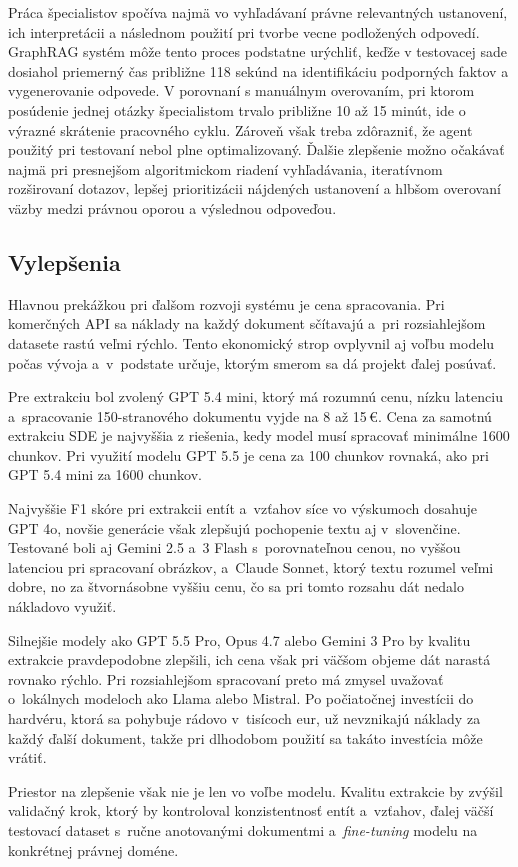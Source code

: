 Práca špecialistov spočíva najmä vo vyhľadávaní právne relevantných ustanovení, ich interpretácii a následnom použití pri tvorbe vecne podložených odpovedí. GraphRAG systém môže tento proces podstatne urýchliť, keďže v testovacej sade dosiahol priemerný čas približne 118 sekúnd na identifikáciu podporných faktov a vygenerovanie odpovede. V porovnaní s manuálnym overovaním, pri ktorom posúdenie jednej otázky špecialistom trvalo približne 10 až 15 minút, ide o výrazné skrátenie pracovného cyklu. Zároveň však treba zdôrazniť, že agent použitý pri testovaní nebol plne optimalizovaný. Ďalšie zlepšenie možno očakávať najmä pri presnejšom algoritmickom riadení vyhľadávania, iteratívnom rozširovaní dotazov, lepšej prioritizácii nájdených ustanovení a hlbšom overovaní väzby medzi právnou oporou a výslednou odpoveďou.


\subsection{Vylepšenia}

Hlavnou prekážkou pri ďalšom rozvoji systému je cena spracovania. Pri komerčných API sa náklady na každý dokument sčítavajú a~pri rozsiahlejšom datasete rastú veľmi rýchlo. Tento ekonomický strop ovplyvnil aj voľbu modelu počas vývoja a~v~podstate určuje, ktorým smerom sa dá projekt ďalej posúvať.

Pre extrakciu bol zvolený GPT 5.4 mini, ktorý má rozumnú cenu, nízku latenciu a~spracovanie 150-stranového dokumentu vyjde na 8 až 15\,€. Cena za samotnú extrakciu SDE je najvyššia z riešenia, kedy model musí spracovať minimálne 1600 chunkov. Pri využití modelu GPT 5.5 je cena za 100 chunkov rovnaká, ako pri GPT 5.4 mini za 1600 chunkov. 

Najvyššie F1 skóre pri extrakcii entít a~vzťahov síce vo výskumoch dosahuje GPT 4o, novšie generácie však zlepšujú pochopenie textu aj v~slovenčine. Testované boli aj Gemini 2.5 a~3 Flash s~porovnateľnou cenou, no vyššou latenciou pri spracovaní obrázkov, a~Claude Sonnet, ktorý textu rozumel veľmi dobre, no za štvornásobne vyššiu cenu, čo sa pri tomto rozsahu dát nedalo nákladovo využiť.

Silnejšie modely ako GPT 5.5 Pro, Opus 4.7 alebo Gemini 3 Pro by kvalitu extrakcie pravdepodobne zlepšili, ich cena však pri väčšom objeme dát narastá rovnako rýchlo. Pri rozsiahlejšom spracovaní preto má zmysel uvažovať o~lokálnych modeloch ako Llama alebo Mistral. Po počiatočnej investícii do hardvéru, ktorá sa pohybuje rádovo v~tisícoch eur, už nevznikajú náklady za každý ďalší dokument, takže pri dlhodobom použití sa takáto investícia môže vrátiť.

Priestor na zlepšenie však nie je len vo voľbe modelu. Kvalitu extrakcie by zvýšil validačný krok, ktorý by kontroloval konzistentnosť entít a~vzťahov, ďalej väčší testovací dataset s~ručne anotovanými dokumentmi a~\textit{fine-tuning} modelu na konkrétnej právnej doméne.
